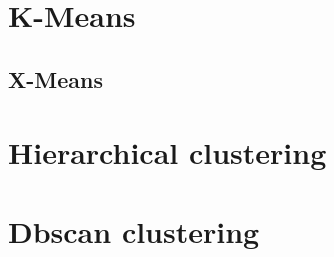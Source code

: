 \documentclass[11pt,a4paper]{report}
\begin{document}
\section{K-Means}

\subsection{X-Means}

\section{Hierarchical clustering}

\section{Dbscan clustering}
\end{document}
